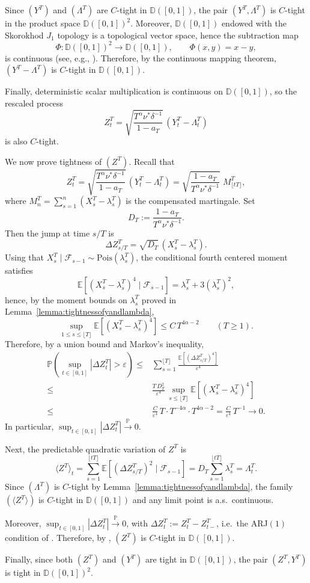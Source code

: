 \documentclass[letterpaper]{article}
\numberwithin{equation}{section}
\theoremstyle{definition}
\theoremstyle{remark}
\begin{document}
{
Since $(Y^T)$ and $(\Lambda^T)$ are $C$-tight in $\mathbb D([0,1])$, the pair $(Y^T,\Lambda^T)$ is $C$-tight in the product space $\mathbb D([0,1])^2$.
Moreover, $\mathbb D([0,1])$ endowed with the Skorokhod $J_1$ topology is a topological vector space, hence the subtraction map
\[
\Phi:\mathbb D([0,1])^2\to \mathbb D([0,1]),\qquad \Phi(x,y)=x-y,
\]
is continuous (see, e.g., \cite[Chapter~VI, \S1]{jacod2013limit}).
Therefore, by the continuous mapping theorem, $(Y^T-\Lambda^T)$ is $C$-tight in $\mathbb D([0,1])$.

Finally, deterministic scalar multiplication is continuous on $\mathbb D([0,1])$, so the rescaled process
\[
Z_t^T=\sqrt{\frac{T^\alpha \nu^*\delta^{-1}}{1-a_T}}\,(Y_t^T-\Lambda_t^T)
\]
is also $C$-tight.

We now prove tightness of $(Z^T)$.
Recall that
\[
Z_t^T=\sqrt{\frac{T^\alpha \nu^*\delta^{-1}}{1-a_T}}\,(Y_t^T-\Lambda_t^T)
      =\sqrt{\frac{1-a_T}{T^\alpha \nu^*\delta^{-1}}}\; M_{\lfloor tT\rfloor}^T,
\]
where $M_n^T=\sum_{s=1}^n(X_s^T-\lambda_s^T)$ is the compensated martingale.
Set
\[
D_T:=\frac{1-a_T}{T^\alpha \nu^*\delta^{-1}}.
\]
Then the jump at time $s/T$ is
\[
\Delta Z_{s/T}^T=\sqrt{D_T}\,(X_s^T-\lambda_s^T).
\]
Using that $X_s^T\mid\mathcal F_{s-1}\sim \mathrm{Pois}(\lambda_s^T)$, the conditional fourth centered moment satisfies
\[
\mathbb E\!\left[(X_s^T-\lambda_s^T)^4\mid\mathcal F_{s-1}\right]
= \lambda_s^T+3(\lambda_s^T)^2,
\]
hence, by the moment bounds on $\lambda_s^T$ proved in Lemma~\ref{lemma:tightnessofyandlambda},
\[
\sup_{1\le s\le \lfloor T\rfloor}\mathbb E\!\left[(X_s^T-\lambda_s^T)^4\right]
\le C\,T^{4\alpha-2}
\qquad(T\ge1).
\]
Therefore, by a union bound and Markov's inequality,
\begin{align*}
\mathbb P\!\left(\sup_{t\in[0,1]}|\Delta Z_t^T|>\varepsilon\right)
\le &\sum_{s=1}^{\lfloor T\rfloor}\frac{\mathbb E[(\Delta Z_{s/T}^T)^4]}{\varepsilon^4}\\
\le &\frac{T\,D_T^2}{\varepsilon^4}\,\sup_{s\le \lfloor T\rfloor}\mathbb E[(X_s^T-\lambda_s^T)^4]\\
\le &\frac{C}{\varepsilon^4}\,T\cdot T^{-4\alpha}\cdot T^{4\alpha-2}
= \frac{C}{\varepsilon^4}\,T^{-1}\to 0.
\end{align*}
In particular, $\sup_{t\in[0,1]}|\Delta Z_t^T|\xrightarrow{\mathbb P}0$.

Next, the predictable quadratic variation of $Z^T$ is
\[
\langle Z^T\rangle_t
=\sum_{s=1}^{\lfloor tT\rfloor}\mathbb E\!\left[(\Delta Z_{s/T}^T)^2\mid\mathcal F_{s-1}\right]
= D_T\sum_{s=1}^{\lfloor tT\rfloor}\lambda_s^T
=\Lambda_t^T.
\]
Since $(\Lambda^T)$ is $C$-tight by Lemma~\ref{lemma:tightnessofyandlambda}, the family
$(\langle Z^T\rangle)$ is $C$-tight in $\mathbb D([0,1])$ and any limit point is a.s.\ continuous.

Moreover, $\sup_{t\in[0,1]}|\Delta Z_t^T|\xrightarrow{\mathbb P}0$, with $\Delta Z_t^T:=Z_t^T-Z_{t-}^T$,
i.e.\ the ARJ$(1)$ condition of \cite{rebolledo1980central}. Therefore, by \cite[Proposition~12]{rebolledo1980central},
$(Z^T)$ is $C$-tight in $\mathbb D([0,1])$.

Finally, since both $(Z^T)$ and $(Y^T)$ are tight in $\mathbb D([0,1])$, the pair $(Z^T,Y^T)$ is tight in $\mathbb D([0,1])^2$.
}
\end{document}
